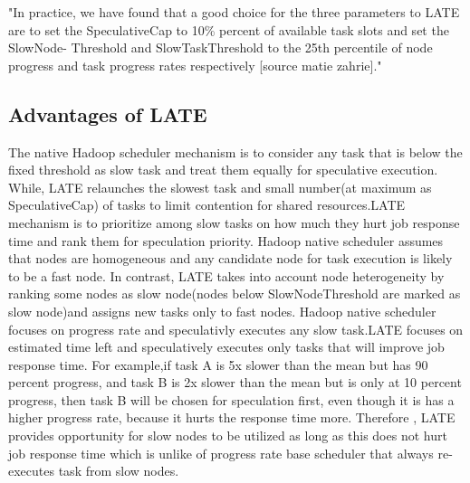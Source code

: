 "In practice, we have found that a good choice for the three parameters to LATE are to set the SpeculativeCap to 10\% percent of available task slots and set the SlowNode- Threshold and SlowTaskThreshold to the 25th percentile of node progress and task progress rates respectively [source matie zahrie]."
 
\subsection{Advantages of LATE}

The native Hadoop scheduler mechanism is to consider any task that is below the fixed threshold as slow task and treat them equally for speculative execution. While, LATE relaunches the slowest task and small number(at maximum as SpeculativeCap) of tasks to limit contention for shared resources.LATE mechanism is to prioritize among slow tasks on how much they hurt job response time and rank them for speculation priority.
Hadoop native scheduler assumes that nodes are homogeneous and any candidate node for task execution is likely to be a fast node. In contrast, LATE takes into account node heterogeneity by ranking some nodes as slow node(nodes below SlowNodeThreshold are marked as slow node)and assigns new tasks only to fast nodes.
Hadoop native scheduler focuses on progress rate and speculativly executes any slow task.LATE focuses on estimated time left and speculatively executes only tasks that will improve job response time. For example,if task A is 5x slower than the mean but has 90 percent progress, and task B is 2x slower than the mean but is only at 10 percent progress, then task B will be chosen for speculation first, even though it is has a higher progress rate, because it hurts the response time more. Therefore , LATE provides opportunity for slow nodes to be utilized as long as this does not hurt job response time which is unlike of progress rate base scheduler that always re-executes task from slow nodes.      


